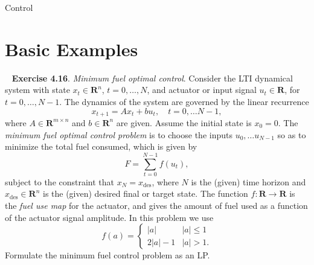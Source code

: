 \begin{chapter}{Control}
    \section{Basic Examples}
    \label{rocket-lp-example}
    \noindent~\cite{boyd_convex_optimization} \textbf{Exercise 4.16}. \textit{Minimum fuel optimal control}.
    Consider the LTI dynamical system with state $x_t \in \mathbf{R}^n$, $t = 0, \ldots, N$, and actuator
    or input signal $u_t \in \mathbf{R}$, for $t = 0, \ldots, N-1$. The dynamics of the system are governed by the
    linear recurrence
    \[x_{t+1} = Ax_t + bu_t, \quad t=0, \ldots N-1,\]
    where $A \in \mathbf{R}^{m \times n}$ and $b \in \mathbf{R}^n$ are given. Assume the initial state is $x_0 = 0$.
    The \textit{minimum fuel optimal control problem} is to choose the inputs $u_0, \ldots u_{N-1}$ so as to
    minimize the total fuel consumed, which is given by
    \[F = \sum_{t=0}^{N-1}f(u_t),\]
    subject to the constraint that $x_N = x_{\text{des}}$, where $N$ is the (given) time horizon and
    $x_{\text{des}} \in \mathbf{R}^n$ is the (given) desired final or target state. The function $f: \mathbf{R} \to \mathbf{R}$
    is the \textit{fuel use map} for the actuator, and gives the amount of fuel used as a function of the actuator signal amplitude.
    In this problem we use
    \[f(a) = \begin{cases}
        \left| a \right| & \left| a \right| \le 1 \\
        2 \left| a \right| - 1 & \left| a \right| > 1.
        \end{cases}\]
    Formulate the minimum fuel control problem as an LP. 


\end{chapter}
